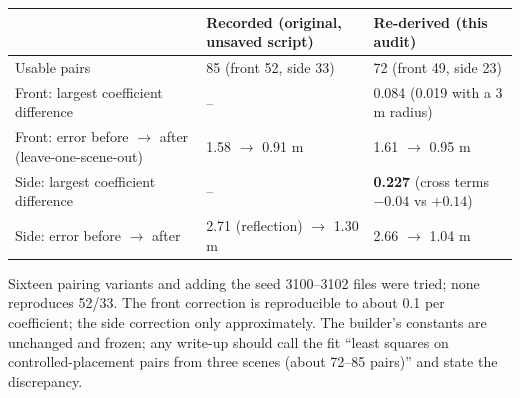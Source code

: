 \documentclass[10.5pt,a4paper]{article}
\begin{document}
\begin{center}\footnotesize\begin{tabular}{@{}p{5.6cm}p{4.4cm}p{4.9cm}@{}}\toprule
 & Recorded (original, unsaved script) & Re-derived (this audit)\\\midrule
Usable pairs & 85 (front 52, side 33) & 72 (front 49, side 23)\\
Front: largest coefficient difference & -- & 0.084 (0.019 with a 3 m radius)\\
Front: error before $\to$ after (leave-one-scene-out) & 1.58 $\to$ 0.91 m & 1.61 $\to$ 0.95 m\\
Side: largest coefficient difference & -- & \textbf{0.227} (cross terms $-0.04$ vs $+0.14$)\\
Side: error before $\to$ after & 2.71 (reflection) $\to$ 1.30 m & 2.66 $\to$ 1.04 m\\\bottomrule\end{tabular}\end{center}
Sixteen pairing variants and adding the seed 3100--3102 files were tried; none reproduces 52/33. The front correction is reproducible to about 0.1 per coefficient; the side correction only approximately. The builder's constants are unchanged and frozen; any write-up should call the fit ``least squares on controlled-placement pairs from three scenes (about 72--85 pairs)'' and state the discrepancy.
\end{document}
